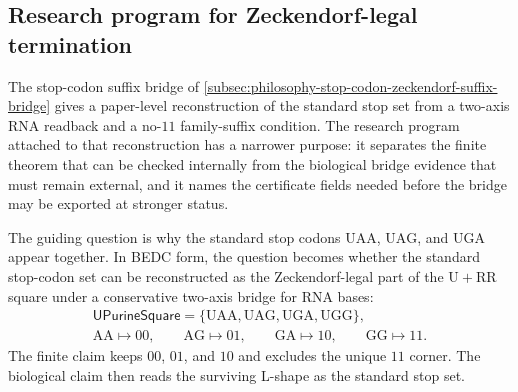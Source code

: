 \subsection{Research program for Zeckendorf-legal termination}
\label{subsec:philosophy-zeckendorf-termination-research-program}

The stop-codon suffix bridge of
\autoref{subsec:philosophy-stop-codon-zeckendorf-suffix-bridge} gives a
paper-level reconstruction of the standard stop set from a two-axis RNA
readback and a no-$11$ family-suffix condition. The research program
attached to that reconstruction has a narrower purpose: it separates
the finite theorem that can be checked internally from the biological
bridge evidence that must remain external, and it names the certificate
fields needed before the bridge may be exported at stronger status.

The guiding question is why the standard stop codons
$\mathrm{UAA}$, $\mathrm{UAG}$, and $\mathrm{UGA}$ appear together. In
BEDC form, the question becomes whether the standard stop-codon set can
be reconstructed as the Zeckendorf-legal part of the
$\mathrm{U}+\mathrm{RR}$ square under a conservative two-axis bridge for
RNA bases:
$$
\begin{gathered}
  \mathsf{UPurineSquare}
  =
  \{\mathrm{UAA},\mathrm{UAG},\mathrm{UGA},\mathrm{UGG}\},\\
  \mathrm{AA}\mapsto 00,\qquad
  \mathrm{AG}\mapsto 01,\qquad
  \mathrm{GA}\mapsto 10,\qquad
  \mathrm{GG}\mapsto 11.
\end{gathered}
$$
The finite claim keeps $00$, $01$, and $10$ and excludes the unique
$11$ corner. The biological claim then reads the surviving L-shape as
the standard stop set.

